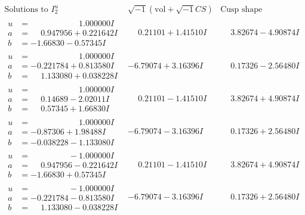 \documentclass[1p]{elsarticle_modified}
\theoremstyle{definition}
\newcommand{\I}{\sqrt{-1}}
\begin{document}
$$\begin{array}{c|c|c}  
\text{Solutions to }I^u_{2}& \I (\text{vol} + \sqrt{-1}CS) & \text{Cusp shape}\\
 \hline 
\begin{aligned}
u &= \phantom{-0.000000 -}1.000000 I \\
a &= \phantom{-}0.947956 + 0.221642 I \\
b &= -1.66830 - 0.57345 I\end{aligned}
 & \phantom{-}0.21101 + 1.41510 I & \phantom{-}3.82674 - 4.90874 I \\ \hline\begin{aligned}
u &= \phantom{-0.000000 -}1.000000 I \\
a &= -0.221784 + 0.813580 I \\
b &= \phantom{-}1.133080 + 0.038228 I\end{aligned}
 & -6.79074 + 3.16396 I & \phantom{-}0.17326 - 2.56480 I \\ \hline\begin{aligned}
u &= \phantom{-0.000000 -}1.000000 I \\
a &= \phantom{-}0.14689 - 2.02011 I \\
b &= \phantom{-}0.57345 + 1.66830 I\end{aligned}
 & \phantom{-}0.21101 - 1.41510 I & \phantom{-}3.82674 + 4.90874 I \\ \hline\begin{aligned}
u &= \phantom{-0.000000 -}1.000000 I \\
a &= -0.87306 + 1.98488 I \\
b &= -0.038228 - 1.133080 I\end{aligned}
 & -6.79074 - 3.16396 I & \phantom{-}0.17326 + 2.56480 I \\ \hline\begin{aligned}
u &= \phantom{-0.000000 } -1.000000 I \\
a &= \phantom{-}0.947956 - 0.221642 I \\
b &= -1.66830 + 0.57345 I\end{aligned}
 & \phantom{-}0.21101 - 1.41510 I & \phantom{-}3.82674 + 4.90874 I \\ \hline\begin{aligned}
u &= \phantom{-0.000000 } -1.000000 I \\
a &= -0.221784 - 0.813580 I \\
b &= \phantom{-}1.133080 - 0.038228 I\end{aligned}
 & -6.79074 - 3.16396 I & \phantom{-}0.17326 + 2.56480 I \\ \hline\begin{aligned}

\end{aligned}
\end{array}$$
\end{document}
